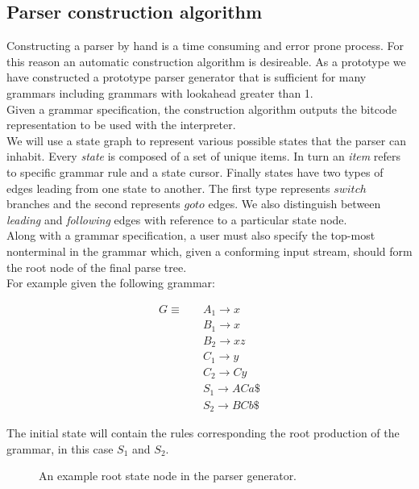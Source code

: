 \documentclass[a4paper,11pt]{article}
\begin{document}
\subsection{Parser construction algorithm}
Constructing a parser by hand is a time consuming and error prone process. For this reason an automatic construction algorithm is desireable.
As a prototype we have constructed a prototype parser generator that is sufficient for many grammars including grammars with lookahead greater than 1.\\
Given a grammar specification, the construction algorithm outputs the bitcode representation to be used with the interpreter.\\

We will use a state graph to represent various possible states that the parser can inhabit. 
Every \emph{state} is composed of a set of unique items. 
In turn an \emph{item} refers to specific grammar rule and a state cursor.
Finally states have two types of edges leading from one state to another. 
The first type represents $switch$ branches and the second represents $goto$ edges. We also distinguish between \emph{leading} and \emph{following} edges with reference to a particular state node.\\

Along with a grammar specification, a user must also specify the top-most nonterminal in the grammar which, given a conforming input stream, should form the root node of the final parse tree.\\
For example given the following grammar:

\parbox{.3\textwidth}{\begin{align*}
G \equiv \quad & A_1 \rightarrow x\\
               & B_1 \rightarrow x\\
               & B_2 \rightarrow x z\\
               & C_1 \rightarrow y\\
               & C_2 \rightarrow C y\\
               & S_1 \rightarrow A C a \$\\
               & S_2 \rightarrow B C b \$
\end{align*}}

The initial state will contain the rules corresponding the root production of the grammar, in this case $S_1$ and $S_2$.

\begin{figure}[!ht]
\begin{center}
\caption{An example root state node in the parser generator.}
\end{center}
\end{figure}
\end{document}
